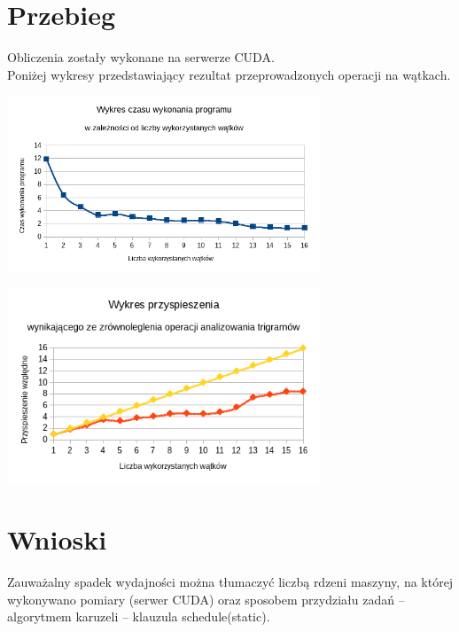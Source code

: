 \documentclass[a4paper,12pt]{article}
\begin{document}
\section*{Przebieg}
Obliczenia zostały wykonane na serwerze CUDA. \\



Poniżej wykresy przedstawiający rezultat przeprowadzonych operacji na wątkach.
\\
\begin{center}
\includegraphics[width=0.7\textwidth]{data/wykonanie.png}
\end{center}


\begin{center}
\includegraphics[width=0.7\textwidth]{data/przyspieszenie.png}
\end{center}


\section*{Wnioski}
Zauważalny spadek wydajności można tłumaczyć liczbą rdzeni maszyny, na której wykonywano pomiary (serwer CUDA) oraz sposobem przydziału zadań – algorytmem karuzeli – klauzula schedule(static).
\end{document}
